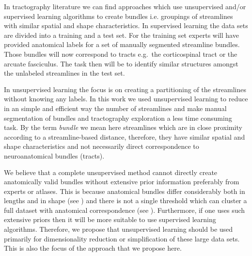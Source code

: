 \documentclass{bioinfo}
\begin{document}
In tractography literature we can find approaches which use unsupervised
and/or supervised learning algorithms to create bundles i.e. groupings
of streamlines with similar spatial and shape characteristics. In
supervised learning the data sets are divided into a training and a test
set. For the training set experts will have provided anatomical labels
for a set of manually segmented streamline bundles. Those bundles will
now correspond to tracts e.g.~the corticospinal tract or the arcuate
fasciculus. The task then will be to identify similar structures amongst
the unlabeled streamlines in the test set.

In unsupervised learning the focus is on creating a partitioning of the
streamlines without knowing any labels. In this work we used
unsupervised learning to reduce in an simple and efficient way the
number of streamlines and make manual segmentation of bundles and
tractography exploration a less time consuming task. By the term
\emph{bundle} we mean here streamlines which are in close proximity
according to a streamline-based distance, therefore, they have similar
spatial and shape characteristics and not necessarily direct
correspondence to neuroanatomical bundles (tracts).

We believe that a complete unsupervised method cannot directly create
anatomically valid bundles without extensive prior information
preferably from experts or atlases. This is because anatomical bundles
differ considerably both in lengths and in shape (see
\citet{schmahmann2009fiber}) and there is not a single threshold which
can cluster a full dataset with anatomical correspondence (see
\citet{Guevara2010}). Furthermore, if one uses such extensive priors
then it will be more suitable to use supervised learning
algorithms. Therefore, we propose that unsupervised learning should be
used primarily for dimensionality reduction or simplification of these
large data sets. This is also the focus of the approach that we propose
here.
\end{document}
